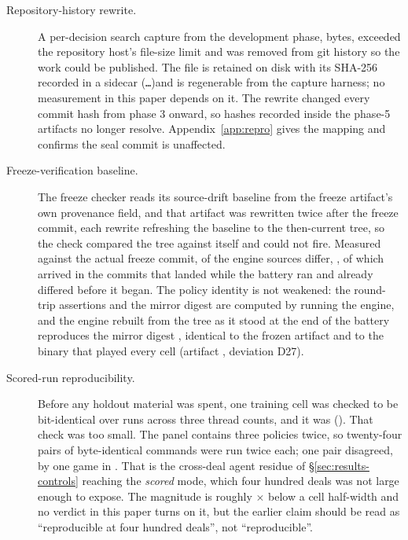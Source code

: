 \begin{description}
\item[Repository-history rewrite.] A per-decision
  search capture from the development phase, \vsevenKfiveBytes{} bytes, exceeded the repository
  host's file-size limit and was removed from git history so the work could be published. The file is
  retained on disk with its SHA-256 recorded in a sidecar
  (\texttt{\vsevenKfiveDigest{}\ldots})\@ and is regenerable from the capture harness; no measurement in
  this paper depends on it. The rewrite changed every commit hash from phase 3 onward, so hashes
  recorded inside the phase-5 artifacts no longer resolve.
  Appendix~\ref{app:repro} gives the mapping and confirms the seal commit is unaffected.
\end{description}
\begin{description}

\item[Freeze-verification baseline.] The freeze checker reads its source-drift baseline from the
  freeze artifact's own provenance field, and that artifact was rewritten twice after the freeze
  commit, each rewrite refreshing the baseline to the then-current tree, so the check compared the
  tree against itself and could not fire. Measured against the actual freeze commit,
  \vsevenDriftChanged{} of the \vsevenDriftTotal{} engine sources differ, \vsevenDriftList{}, of
  which \vsevenDriftMidBattery{} arrived in the commits that landed while the battery ran and
  \vsevenDriftPreBattery{} already differed before it began. The policy identity is not weakened:
  the round-trip assertions and the mirror digest are computed by running the engine, and the
  engine rebuilt from the tree as it stood at the end of the battery reproduces the mirror digest
  \texttt{\vsevenMirrorDigest{}}, identical to the frozen artifact and to the binary that played
  every cell (artifact , deviation D27).

\item[Scored-run reproducibility.]
  \label{app:corrections-reproducibility}
  Before any holdout material was spent, one training cell was checked to be bit-identical over
  \vsevenReproRuns{} runs across three thread counts, and it was
  (\vsevenReproIdentical{}). That check was too small. The panel contains three policies
  twice, so twenty-four pairs of byte-identical commands were run twice each; one pair disagreed, by
  one game in \vsevenResidueGames{}. That is the cross-deal agent residue of \S\ref{sec:results-controls}
  reaching the \emph{scored} mode, which four hundred deals was not large enough to expose. The
  magnitude is roughly \vsevenResidueRatio$\times$ below a cell half-width and no verdict in this paper turns on
  it, but the earlier claim should be read as ``reproducible at four hundred deals'', not
  ``reproducible''.


\end{description}
